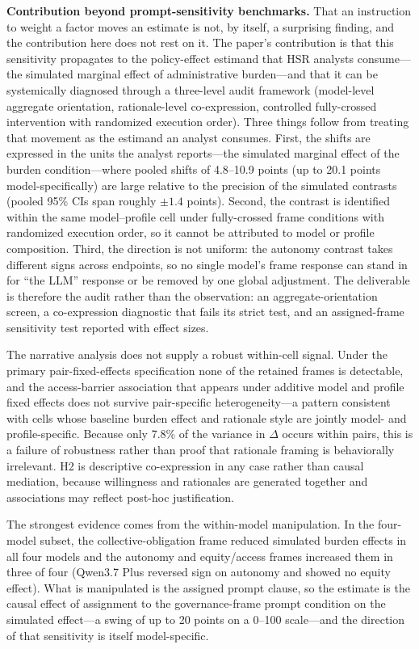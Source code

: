 \documentclass[12pt,a4paper]{article}
\begin{document}
\textbf{Contribution beyond prompt-sensitivity benchmarks.} That an instruction to weight a factor moves an estimate is not, by itself, a surprising finding, and the contribution here does not rest on it. The paper's contribution is that this sensitivity propagates to the policy-effect estimand that HSR analysts consume---the simulated marginal effect of administrative burden---and that it can be systemically diagnosed through a three-level audit framework (model-level aggregate orientation, rationale-level co-expression, controlled fully-crossed intervention with randomized execution order). Three things follow from treating that movement as the estimand an analyst consumes. First, the shifts are expressed in the units the analyst reports---the simulated marginal effect of the burden condition---where pooled shifts of 4.8--10.9 points (up to 20.1 points model-specifically) are large relative to the precision of the simulated contrasts (pooled 95\% CIs span roughly $\pm 1.4$ points). Second, the contrast is identified within the same model--profile cell under fully-crossed frame conditions with randomized execution order, so it cannot be attributed to model or profile composition. Third, the direction is not uniform: the autonomy contrast takes different signs across endpoints, so no single model's frame response can stand in for ``the LLM'' response or be removed by one global adjustment. The deliverable is therefore the audit rather than the observation: an aggregate-orientation screen, a co-expression diagnostic that fails its strict test, and an assigned-frame sensitivity test reported with effect sizes.


The narrative analysis does not supply a robust within-cell signal. Under the primary pair-fixed-effects specification none of the retained frames is detectable, and the access-barrier association that appears under additive model and profile fixed effects does not survive pair-specific heterogeneity---a pattern consistent with cells whose baseline burden effect and rationale style are jointly model- and profile-specific. Because only 7.8\% of the variance in \(\Delta\) occurs within pairs, this is a failure of robustness rather than proof that rationale framing is behaviorally irrelevant. H2 is descriptive co-expression in any case rather than causal mediation, because willingness and rationales are generated together and associations may reflect post-hoc justification.

The strongest evidence comes from the within-model manipulation. In the four-model subset, the collective-obligation frame reduced simulated burden effects in all four models and the autonomy and equity/access frames increased them in three of four (Qwen3.7 Plus reversed sign on autonomy and showed no equity effect). What is manipulated is the assigned prompt clause, so the estimate is the causal effect of assignment to the governance-frame prompt condition on the simulated effect---a swing of up to 20 points on a 0--100 scale---and the direction of that sensitivity is itself model-specific.
\end{document}
